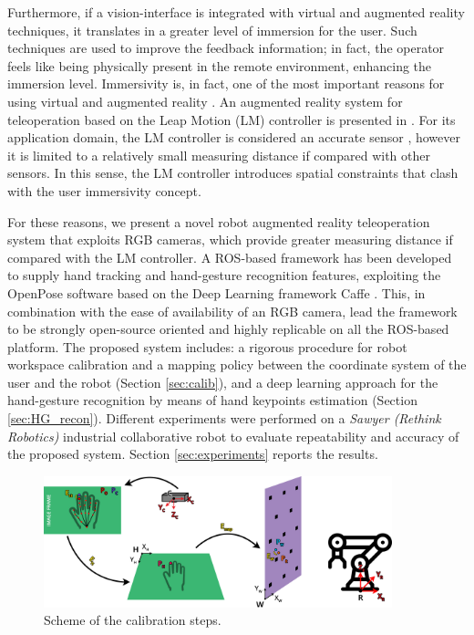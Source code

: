 \documentclass[a4paper, 10 pt, conference]{ieeeconf}      %
\begin{document}
Furthermore, if a vision-interface is integrated with virtual and augmented reality techniques, it translates in a greater level of immersion for the user. Such techniques are used to improve the feedback information; in fact, the operator feels like being physically present in the remote environment, enhancing the immersion level. Immersivity is, in fact, one of the most important reasons for using virtual and augmented reality \cite{Boboc2012}.
An augmented reality system for teleoperation based on the Leap Motion (LM) controller is presented in \cite{Peppoloni2015}. For its application domain, the LM controller is considered an accurate sensor \cite{Hedayati2018}, however it is limited to a relatively small measuring distance if compared with other sensors. In this sense, the LM controller introduces spatial constraints that clash with the user immersivity concept.

For these reasons, we present a novel robot augmented reality teleoperation system that exploits RGB cameras, which provide greater measuring distance if compared with the LM controller. A ROS-based framework has been developed to supply hand tracking and hand-gesture recognition features, exploiting the OpenPose software \cite{simon2017hand, cao2018openpose} based on the Deep Learning framework Caffe \cite{jia2014caffe}.
This, in combination with the ease of availability of an RGB camera, lead the framework to be strongly open-source oriented and highly replicable on all the ROS-based platform. The proposed system includes: a rigorous procedure for robot workspace calibration and a mapping policy between the coordinate system of the user and the robot (Section \ref{sec:calib}), and a deep learning approach for the hand-gesture recognition by means of hand keypoints estimation (Section \ref{sec:HG_recon}).
Different experiments were performed on a \textit{Sawyer (Rethink Robotics)} industrial collaborative robot to evaluate repeatability and accuracy of the proposed system. Section \ref{sec:experiments} reports the results.

\begin{figure}[ht]
\centering
  \includegraphics[width=0.9\textwidth]{figures/horizcalib}
  \caption{Scheme of the calibration steps.}
  \label{fig:wscalib}
\end{figure}
\end{document}

